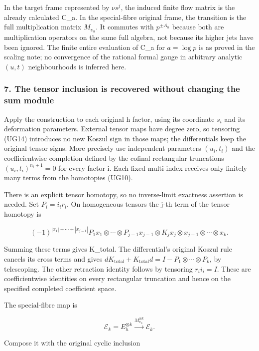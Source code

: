 \documentclass{article}
\begin{document}
In the target frame represented by \(\nu s^j\), the induced finite flow matrix is the already calculated C\_a. In the special-fibre original frame, the transition is the full multiplication matrix \(M_{\upsilon_h}\). It commutes with \(p^{\pm A_h}\) because both are multiplication operators on the same full algebra, not because its higher jets have been ignored. The finite entire evaluation of C\_a for \(a=\log p\) is as proved in the scaling note; no convergence of the rational formal gauge in arbitrary analytic \((u,t)\) neighbourhoods is inferred here.

\subsubsection{7. The tensor inclusion is recovered without changing the sum module}\label{endpoint-f1_unit_gauge--the-tensor-inclusion-is-recovered-without-changing-the-sum-module}

Apply the construction to each original h factor, using its coordinate \(s_i\) and its deformation parameters. External tensor maps have degree zero, so tensoring (UG14) introduces no new Koszul sign in those maps; the differentials keep the original tensor signs. More precisely use independent parameters \((u_i,t_i)\) and the coefficientwise completion defined by the cofinal rectangular truncations \((u_i,t_i)^{n_i+1}=0\) for every factor i. Each fixed multi-index receives only finitely many terms from the homotopies (UG10).

There is an explicit tensor homotopy, so no inverse-limit exactness assertion is needed. Set \(P_i=i_i r_i\). On homogeneous tensors the j-th term of the tensor homotopy is

\[
(-1)^{|x_1|+\cdots+|x_{j-1}|}
P_1x_1\otimes\cdots\otimes P_{j-1}x_{j-1}
\otimes K_jx_j\otimes x_{j+1}\otimes\cdots\otimes x_k.
\]

Summing these terms gives K\_total. The differential's original Koszul rule cancels its cross terms and gives \(d K_{\mathrm{total}}+K_{\mathrm{total}}d=I-P_1\otimes\cdots\otimes P_k\), by telescoping. The other retraction identity follows by tensoring \(r_i i_i=I\). These are coefficientwise identities on every rectangular truncation and hence on the specified completed coefficient space.

The special-fibre map is

\[
\mathcal E_k=E_h^{\otimes k}
\xrightarrow{M_{\upsilon_h}^{\otimes k}}\mathcal E_k.
\tag{UG18}
\]

Compose it with the original cyclic inclusion
\end{document}
